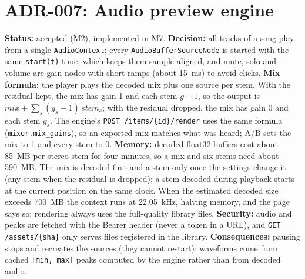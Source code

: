 \section{ADR-007: Audio preview engine}
\textbf{Status:} accepted (M2), implemented in M7. \textbf{Decision:} all
tracks of a song play from a single \texttt{AudioContext}; every
\texttt{AudioBufferSourceNode} is started with the same \texttt{start(t)} time,
which keeps them sample-aligned, and mute, solo and volume are gain nodes with
short ramps (about 15~ms) to avoid clicks. \textbf{Mix formula:} the player
plays the decoded mix plus one source per stem. With the residual kept, the mix
has gain 1 and each stem $g-1$, so the output is
$\mathit{mix} + \sum_s (g_s - 1)\,\mathit{stem}_s$; with the residual dropped,
the mix has gain 0 and each stem $g_s$. The engine's
\texttt{POST /items/\{id\}/render} uses the same formula
(\texttt{mixer.mix\_gains}), so an exported mix matches what was heard; A/B sets
the mix to 1 and every stem to 0. \textbf{Memory:} decoded float32 buffers cost
about 85~MB per stereo stem for four minutes, so a mix and six stems need about
590~MB. The mix is decoded first and a stem only once the settings change it
(any stem when the residual is dropped); a stem decoded during playback starts
at the current position on the same clock. When the estimated decoded size
exceeds 700~MB the context runs at 22.05~kHz, halving memory, and the page says
so; rendering always uses the full-quality library files.
\textbf{Security:} audio and peaks are fetched with the Bearer header (never a
token in a URL), and \texttt{GET /assets/\{sha\}} only serves files registered
in the library. \textbf{Consequences:} pausing stops and recreates the sources
(they cannot restart); waveforms come from cached \texttt{[min, max]} peaks
computed by the engine rather than from decoded audio.

